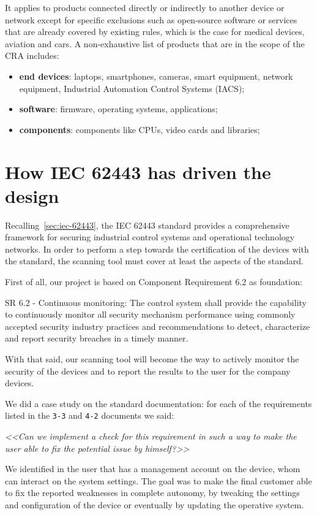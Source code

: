 It applies to products connected directly or indirectly to another device or network except for specific exclusions such as open-source software or services that are already covered by existing rules, which is the case for medical devices, aviation and cars. A non-exhaustive list of products that are in the scope of the CRA includes:~\cite{cra-overview}
\begin{itemize}
  \item \textbf{end devices}: laptops, smartphones, cameras, smart equipment, network equipment, Industrial Automation Control Systems (IACS);
  \item \textbf{software}: firmware, operating systems, applications;
  \item \textbf{components}: components like CPUs, video cards and libraries;
\end{itemize}


\section{How IEC 62443 has driven the design}
\label{sec:iec-62443-driven-design}

Recalling~\cref{sec:iec-62443}, the IEC 62443 standard provides a comprehensive framework for securing industrial control systems and operational technology networks. In order to perform a step towards the certification of the devices with the standard, the scanning tool must cover at least the aspects of the standard.

First of all, our project is based on Component Requirement 6.2 as foundation:
\begin{mdframed}
  SR 6.2 - Continuous monitoring: The control system shall provide the capability to continuously monitor all security mechanism performance using commonly accepted security industry practices and recommendations to detect, characterize and report security breaches in a timely manner.
\end{mdframed}
With that said, our scanning tool will become the way to actively monitor the security of the devices and to report the results to the user for the company devices.

We did a case study on the standard documentation: for each of the requirements listed in the \texttt{3-3} and \texttt{4-2} documents we said:
\begin{mdframed}
  \textit{\textless\textless Can we implement a check for this requirement in such a way to make the user able to fix the potential issue by himself?\textgreater\textgreater}
\end{mdframed}\label{stm:check-}
We identified in the user that has a management account on the device, whom can interact on the system settings. The goal was to make the final customer able to fix the reported weaknesses in complete autonomy, by tweaking the settings and configuration of the device or eventually by updating the operative system.

